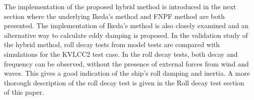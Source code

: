 \quad The implementation of the proposed hybrid method is introduced in
the next section where the underlying Ikeda's method and FNPF method are
both presented. The implementation of Ikeda's method is also closely
examined and an alternative way to calculate eddy damping is proposed.
In the validation study of the hybrid method, roll decay tests from
model tests are compared with simulations for the KVLCC2 test case. In
the roll decay tests, both decay and frequency can be observed, without
the presence of external forces from wind and waves. This gives a good
indication of the ship's roll damping and inertia. A more thorough
description of the roll decay test is given in the Roll decay test
section of this paper.

    
